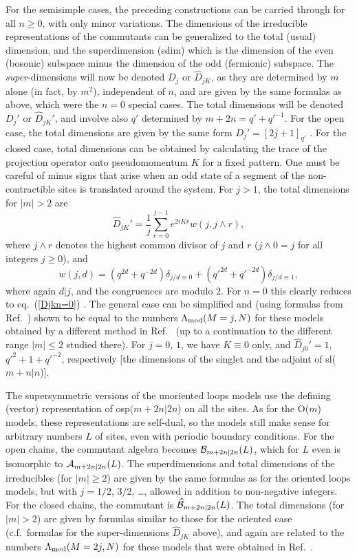 \documentclass[twocolumn,floats,pra]{revtex4}
\newcommand {\be}{\begin{equation}}
\newcommand {\ee} {\end{equation}}
\begin{document}
For the semisimple cases, the preceding constructions can be
carried through for all $n\geq 0$, with only minor variations. The
dimensions of the irreducible representations of the commutants
can be generalized to the total (usual) dimension, and the
superdimension (sdim) which is the dimension of the even (bosonic)
subspace minus the dimension of the odd (fermionic) subspace. The
{\em super}-dimensions will now be denoted $D_j$ or
$\widehat{D}_{jK}$, as they are determined by $m$ alone (in fact,
by $m^2$), independent of $n$, and are given by the same formulas
as above, which were the $n=0$ special cases. The total dimensions
will be denoted $D_j'$ or $\widehat{D}_{jK}'$, and involve also
$q'$ determined by $m+2n=q'+q'^{-1}$. For the open case, the total
dimensions are given by the same form $D_j'=[2j+1]_{q'}$
\cite{rs}. For the closed case, total dimensions can be obtained
by calculating the trace of the projection operator onto
pseudomomentum $K$ for a fixed pattern. One must be careful of
minus signs that arise when an odd state of a segment of the
non-contractible sites is translated around the system. For
$j>1$, the total dimensions for $|m|>2$ are%
\be%
\widehat{D}_{jK}'=\frac{1}{j}\sum_{r=0}^{j-1}e^{2iKr}w(j,j\wedge
r),\ee where $j\wedge r$ denotes the highest common divisor of $j$
and $r$ ($j\wedge0=j$ for all integers $j\geq0$), and %
\be%
w(j,d)=(q^{2d}+q^{-2d})\delta_{j/d\equiv
0}+(q'^{2d}+q'^{-2d})\delta_{j/d\equiv1},\ee%
where again $d|j$, and the congruences are modulo $2$. For $n=0$
this clearly reduces to eq.\ (\ref{Djkn=0}) \cite{jones2}. The
general case can be simplified and (using formulas from Ref.\
\cite{hw}) shown to be equal to the numbers $\Lambda_{\rm
mod}(M=j,N)$ for these models obtained by a different method in
Ref.\ \cite{rs} (up to a continuation to the different range
$|m|\leq2$ studied there). For $j=0$, $1$, we have $K\equiv0$
only, and $\widehat{D}_{j0}'=1$, $q'^2+1+q'^{-2}$, respectively
[the dimensions of the singlet and the adjoint of sl($m+n|n$)].

The supersymmetric versions of the unoriented loops models use the
defining (vector) representation of osp$(m+2n|2n$) on all the
sites. As for the O($m$) models, these representations are
self-dual, so the models still make sense for arbitrary numbers
$L$ of sites, even with periodic boundary conditions. For the open
chains, the commutant algebra becomes ${\cal B}_{m+2n|2n}(L)$,
which for $L$ even is isomorphic to ${\cal A}_{m+2n|2n}(L)$. The
superdimensions and total dimensions of the irreducibles (for
$|m|\geq 2$) are given by the same formulas as for the oriented
loops models, but with $j=1/2$, $3/2$, \ldots, allowed in addition
to non-negative integers. For the closed chains, the commutant is
$\widehat{\cal B}_{m+2n|2n}(L)$. The total dimensions (for
$|m|>2$) are given by formulas similar to those for the oriented
case (c.f.\ formulas for the super-dimensions $\widehat{D}_{jK}$
above), and again are related to the numbers $\Lambda_{\rm
mod}(M=2j,N)$ for these models that were obtained in Ref.\
\cite{rs}.
\end{document}
